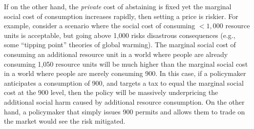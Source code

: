 \documentclass[12pt, final]{article}
\begin{document}
If on the other hand, the \emph{private} cost of abstaining is fixed yet the marginal social cost of consumption increases rapidly, then setting a price is riskier. For example, consider a scenario where the social cost of consuming $<1,000$ resource units is acceptable, but going above 1,000 risks disastrous consequences (e.g., some ``tipping point'' theories of global warming\cite{wiki:runaway}). The marginal social cost of consuming an additional resource unit in a world where people are already consuming 1,050 resource units will be much higher than the marginal social cost in a world where people are merely consuming 900. In this case, if a policymaker anticipates a consumption of 900, and targets a tax to equal the marginal social cost at the 900 level, then the policy will be massively underpricing the additional social harm caused by additional resource consumption. On the other hand, a policymaker that simply issues 900 permits and allows them to trade on the market would see the risk mitigated.
\end{document}
